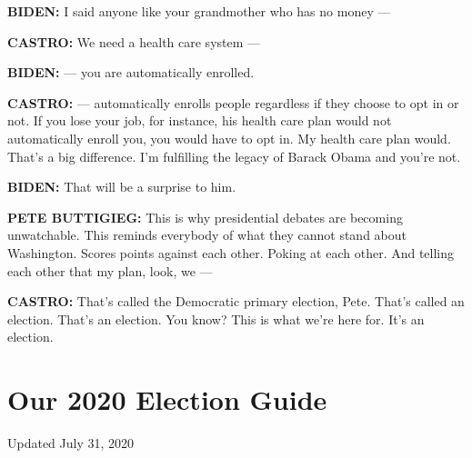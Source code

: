 \textbf{BIDEN:} I said anyone like your grandmother who has no money ---

\textbf{CASTRO:} We need a health care system ---

\textbf{BIDEN:} --- you are automatically enrolled.

\textbf{CASTRO:} --- automatically enrolls people regardless if they
choose to opt in or not. If you lose your job, for instance, his health
care plan would not automatically enroll you, you would have to opt in.
My health care plan would. That's a big difference. I'm fulfilling the
legacy of Barack Obama and you're not.

\textbf{BIDEN:} That will be a surprise to him.

\textbf{PETE BUTTIGIEG:} This is why presidential debates are becoming
unwatchable. This reminds everybody of what they cannot stand about
Washington. Scores points against each other. Poking at each other. And
telling each other that my plan, look, we ---

\textbf{CASTRO:} That's called the Democratic primary election, Pete.
That's called an election. That's an election. You know? This is what
we're here for. It's an election.

\hypertarget{our-2020-election-guide}{%
\section{Our 2020 Election Guide}\label{our-2020-election-guide}}

Updated July 31, 2020

